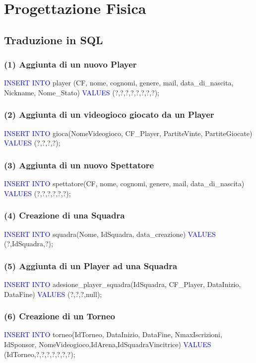 \documentclass[a4paper,12pt]{report}
\begin{document}
\chapter{Progettazione Fisica}
\section{Traduzione in SQL}
\subsection*{(1) Aggiunta di un nuovo Player}
\textcolor{blue}{INSERT INTO} player (CF, nome, cognomi, genere, mail, data\_di\_nascita, Nickname, Nome\_Stato)
\textcolor{blue}{VALUES} (?,?,?,?,?,?,?,?);

\subsection*{(2) Aggiunta di un videogioco giocato da un Player}
\textcolor{blue}{INSERT INTO} gioca(NomeVideogioco, CF\_Player, PartiteVinte, PartiteGiocate)
\textcolor{blue}{VALUES} (?,?,?,?);

\subsection*{(3) Aggiunta di un nuovo Spettatore}
\textcolor{blue}{INSERT INTO} spettatore(CF, nome, cognomi, genere, mail, data\_di\_nascita)
\textcolor{blue}{VALUES} (?,?,?,?,?,?);

\subsection*{(4) Creazione di una Squadra}
\textcolor{blue}{INSERT INTO} squadra(Nome, IdSquadra, data\_creazione)
\textcolor{blue}{VALUES} (?,IdSquadra,?);

\subsection*{(5) Aggiunta di un Player ad una Squadra}
\textcolor{blue}{INSERT INTO} adesione\_player\_squadra(IdSquadra, CF\_Player, DataInizio, DataFine)
\textcolor{blue}{VALUES} (?,?,?,null);

\subsection*{(6) Creazione di un Torneo}
\textcolor{blue}{INSERT INTO} torneo(IdTorneo, DataInizio, DataFine, NmaxIscrizioni, IdSponsor, NomeVideogioco,IdArena,IdSquadraVincitrice)
\textcolor{blue}{VALUES} (IdTorneo,?,?,?,?,?,?,?);
\end{document}
